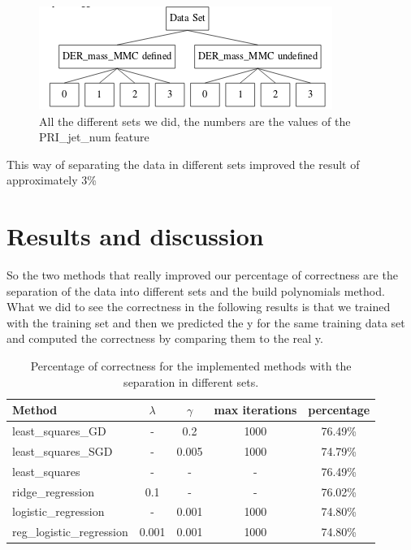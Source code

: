 \documentclass[10pt,conference,compsocconf]{IEEEtran}
\begin{document}
\begin{description}
\begin{figure}[hbtp]
  \centering
  \includegraphics[width=\columnwidth]{images/treeSets.png}
  \caption{All the different sets we did, the numbers are the values of the PRI\_jet\_num feature}
  \vspace{-3mm}
  \label{fig:tree-sets}
\end{figure}

This way of separating the data in different sets improved the result of approximately 3\%

\end{description}

\section{Results and discussion}

So the two methods that really improved our percentage of correctness are the separation of the data into different sets and the build polynomials method. What we did to see the correctness in the following results is that we trained with the training set and then we predicted the y for the same training data set and computed the correctness by comparing them to the real y. 

\begin{table}[h]
\centering
  \begin{tabular}[c]{|l||c|c|c||c|}
    \hline
    Method&$\lambda$&$\gamma$&max iterations&percentage\\
    \hline
    least\_squares\_GD&-&0.2&1000&76.49\%\\
    \hline
    least\_squares\_SGD&-&0.005&1000&74.79\%\\
    \hline
    least\_squares&-&-&-&76.49\%\\
    \hline
    ridge\_regression&0.1&-&-&76.02\%\\
    \hline
    logistic\_regression&-&0.001&1000&74.80\%\\
    \hline
    reg\_logistic\_regression&0.001&0.001&1000&74.80\%\\
    \hline
  \end{tabular}
  \caption{Percentage of correctness for the implemented methods with the separation in different sets.}
  \label{tab:per-sets}
\end{table}
\end{document}
